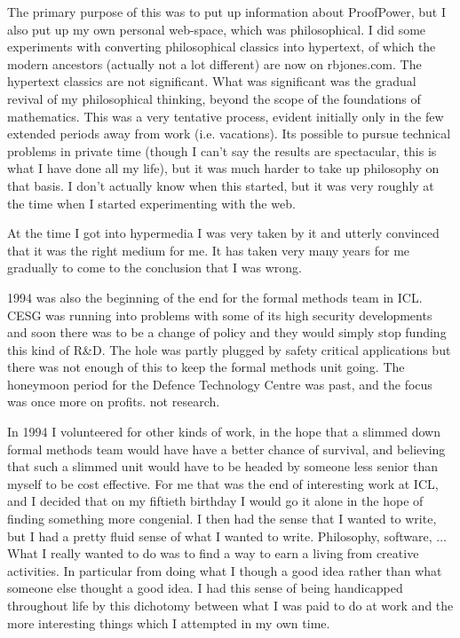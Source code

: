 The primary purpose of this was to put up information about ProofPower, but I also put up my own personal web-space, which was philosophical.
I did some experiments with converting philosophical classics into hypertext, of which the modern ancestors (actually not a lot different) are now on rbjones.com.
The hypertext classics are not significant.
What was significant was the gradual revival of my philosophical thinking, beyond the scope of the foundations of mathematics.
This was a very tentative process, evident initially only in the few extended periods away from work (i.e. vacations).
Its possible to pursue technical problems in private time (though I can't say the results are spectacular, this is what I have done all my life), but it was much harder to take up philosophy on that basis.
I don't actually know when this started, but it was very roughly at the time when I started experimenting with the web.

At the time I got into hypermedia I was very taken by it and utterly convinced that it was the right medium for me.
It has taken very many years for me gradually to come to the conclusion that I was wrong.

1994 was also the beginning of the end for the formal methods team in ICL.
CESG was running into problems with some of its high security developments and soon there was to be a change of policy and they would simply stop funding this kind of R\&D.
The hole was partly plugged by safety critical applications but there was not enough of this to keep the formal methods unit going.
The honeymoon period for the Defence Technology Centre was past, and the focus was once more on profits. not research.

In 1994 I volunteered for other kinds of work, in the hope that a slimmed down formal methods team would have have a better chance of survival, and believing that such a slimmed unit would have to be headed by someone less senior than myself to be cost effective.
For me that was the end of interesting work at ICL, and I decided that on my fiftieth birthday I would go it alone in the hope of finding something more congenial.
I then had the sense that I wanted to write, but I had a pretty fluid sense of what I wanted to write.
Philosophy, software, ...
What I really wanted to do was to find a way to earn a living from creative activities.
In particular from doing what I though a good idea rather than what someone else thought a good idea.
I had this sense of being handicapped throughout life by this dichotomy between what I was paid to do at work and the more interesting things which I attempted in my own time.

